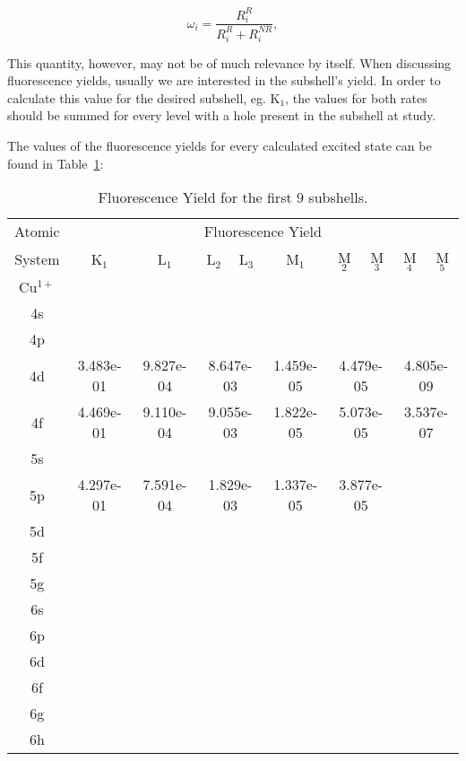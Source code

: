 \begin{equation}
    \omega_i=\frac{R_i^{R}}{R_i^{R}+R_i^{NR}},
\end{equation}

This quantity, however, may not be of much relevance by itself. When discussing fluorescence yields, usually we are interested in the subshell's yield. In order to calculate this value for the desired subshell, eg. K$_1$, the values for both rates should be summed for every level with a hole present in the subshell at study.

The values of the fluorescence yields for every calculated excited state can be found in Table~\ref{tab:FY}:

\begin{table}[h!]
    \centering
    \caption{Fluorescence Yield for the first 9 subshells.}
    \label{tab:FY}
    \begin{tabular}{c||c|c|c|c|c|c|c|c|c}
        \toprule Atomic&\multicolumn{9}{c}{Fluorescence Yield}\\
        System&K$_1$&L$_1$&L$_2$&L$_3$&M$_1$&M$_2$&M$_3$&M$_4$&M$_5$\\
        \midrule
        Cu$^{1+}$ \\ 
        4s&  \\
        4p &  &\\
        4d &3.483e-01 &9.827e-04&\multicolumn{2}{c|}{8.647e-03}&1.459e-05&\multicolumn{2}{c|}{4.479e-05}&\multicolumn{2}{c}{4.805e-09}\\
        4f &4.469e-01&9.110e-04&\multicolumn{2}{c|}{9.055e-03}&1.822e-05&\multicolumn{2}{c|}{5.073e-05}&\multicolumn{2}{c}{3.537e-07} \\
        5s & \\
        5p &4.297e-01&7.591e-04&\multicolumn{2}{c|}{1.829e-03}&1.337e-05&\multicolumn{2}{c|}{3.877e-05} \\
        5d & \\
        5f & \\
        5g & \\
        6s & \\
        6p & \\
        6d & \\
        6f & \\
        6g & \\
        6h&\\
        \bottomrule
    \end{tabular}
\end{table}

